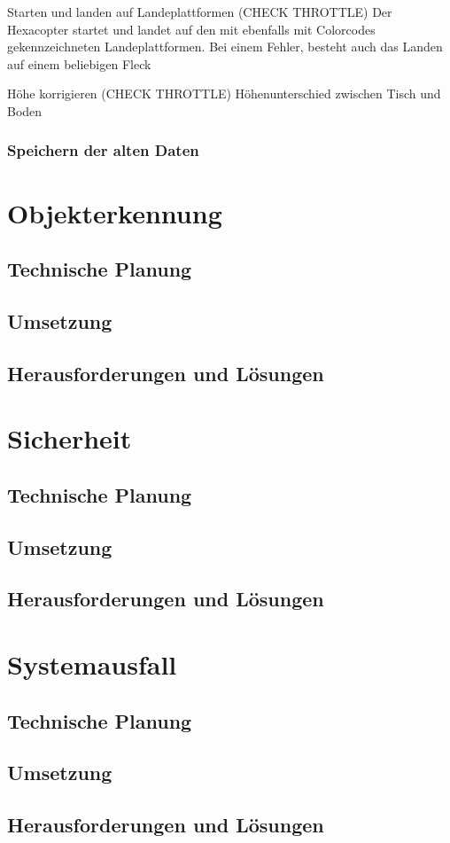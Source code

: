     Starten und landen auf Landeplattformen (CHECK THROTTLE)
    Der Hexacopter startet und landet auf den mit ebenfalls mit Colorcodes gekennzeichneten Landeplattformen.
    Bei einem Fehler, besteht auch das Landen auf einem beliebigen Fleck

    Höhe korrigieren (CHECK THROTTLE)
    Höhenunterschied zwischen Tisch und Boden

    \subsubsection{Speichern der alten Daten}


\section{Objekterkennung}

  \subsection{Technische Planung}

  \subsection{Umsetzung}

  \subsection{Herausforderungen und Lösungen}

\section{Sicherheit}

  \subsection{Technische Planung}

  \subsection{Umsetzung}

  \subsection{Herausforderungen und Lösungen}

\section{Systemausfall}

  \subsection{Technische Planung}

  \subsection{Umsetzung}

  \subsection{Herausforderungen und Lösungen}
